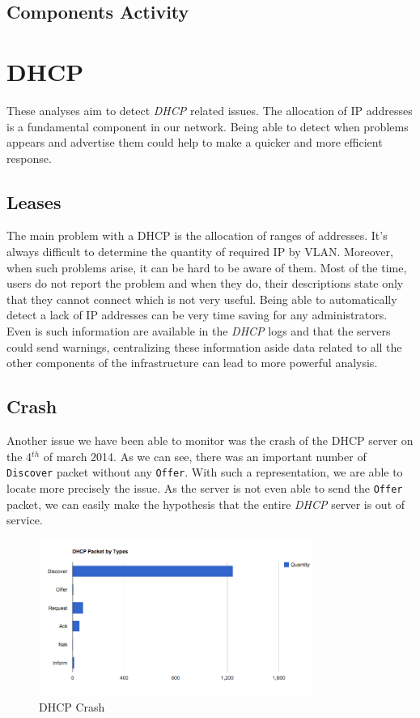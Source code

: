\subsection{Components Activity}


\section{DHCP}
These analyses aim to detect \emph{DHCP} related issues. The allocation  of IP addresses is a fundamental component in our network. Being able to detect when problems appears and advertise them could help to make a quicker and more efficient response.

\subsection{Leases}
The main problem with a DHCP is the allocation of ranges of addresses. It's always difficult to determine the quantity of required IP by VLAN. Moreover, when such problems arise, it can be hard to be aware of them. Most of the time, users do not report the problem and when they do, their descriptions state only that they cannot connect which is not very useful. Being able to automatically detect a lack of IP addresses can be very time saving for any administrators. Even is such information are available in the \emph{DHCP} logs and that the servers could send warnings, centralizing these information aside data related to all the other components of the infrastructure can lead to more powerful analysis. 

\subsection{Crash}
Another issue we have been able to monitor was the crash of the DHCP server on the 4$^{th}$ of march 2014. As we can see, there was an important number of \texttt{Discover} packet without any \texttt{Offer}. With such a representation, we are able to locate more precisely the issue. As the server is not even able to send the \texttt{Offer} packet, we can easily make the hypothesis that the entire \emph{DHCP} server is out of service.

\begin{figure}[H]
	\centering
   \includegraphics[width=0.8\textwidth]{Pictures/chapter5/dhcpCrash.png}
   \caption{DHCP Crash}
\end{figure}

